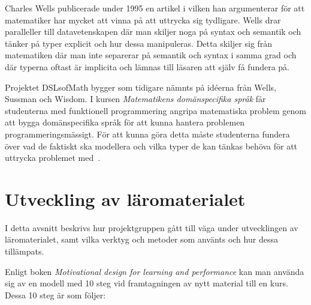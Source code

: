 \documentclass[]{article}
\begin{document}
Charles Wells publicerade under 1995 en artikel \cite{wells1995communicating}
i vilken han argumenterar för att matematiker har mycket att vinna på att
uttrycka  sig tydligare. Wells drar paralleller till datavetenskapen där man
skiljer noga på syntax och semantik och tänker på typer explicit och hur dessa
manipuleras. Detta skiljer sig från matematiken där man inte separerar på
semantik och syntax i samma grad och där typerna oftast är implicita och lämnas
till läsaren att själv få fundera på.

Projektet DSLsofMath bygger som tidigare nämnts på idéerna från Wells, Sussman
och Wisdom. I kursen \textit{Matematikens domänspecifika språk} får studenterna
med funktionell programmering angripa matematiska problem genom att bygga
domänspecifika språk för att kunna hantera problemen programmeringsmässigt.
För att kunna göra detta måste studenterna fundera över vad de faktiskt ska
modellera och vilka typer de kan tänkas behöva för att uttrycka problemet
med~\cite{kursplan:dslsofmath}.

\section{Utveckling av läromaterialet}
\label{sec:utveckling}



I detta avsnitt beskrivs hur projektgruppen gått till väga under utvecklingen av läromaterialet, samt vilka verktyg och
metoder som använts och hur dessa tillämpats.

Enligt boken \textit{Motivational design for learning and performance} kan man använda sig av en modell med 10 steg vid
framtagningen av nytt material till en kurs. Dessa 10 steg är som följer:
\end{document}
